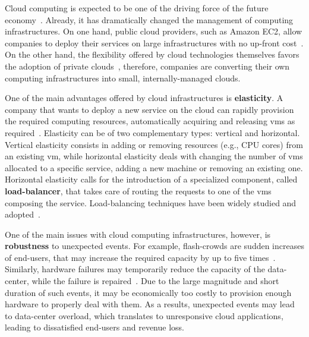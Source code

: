 Cloud computing is expected to be one of the driving force of the
future economy~\citep{WPonMckinsey13}. Already, it has dramatically
changed the management of computing infrastructures. On one hand,
public cloud providers, such as Amazon EC2, allow companies to deploy
their services on large infrastructures with no up-front
cost~\citep{Buyya09:FGCS}. On the other hand, the flexibility offered
by cloud technologies themselves favors the adoption of private
clouds~\citep{Gulati11:HotCloud}, therefore, companies are converting
their own computing infrastructures into small, internally-managed
clouds.

One of the main advantages offered by cloud infrastructures is {\bf
  elasticity}. A company that wants to deploy a new service on the
cloud can rapidly provision the required computing resources,
automatically acquiring and releasing \acp{vm} as
required~\citep{Herbst13:ICAC}.  Elasticity can be of two
complementary types: vertical and horizontal. Vertical elasticity
consists in adding or removing resources (e.g., CPU cores) from an
existing \ac{vm}, while horizontal elasticity deals with changing the
number of \acp{vm} allocated to a specific service, adding a new
machine or removing an existing one.
%
Horizontal elasticity calls for the introduction of a specialized
component, called {\bf load-balancer}, that takes care of routing the
requests to one of the \acp{vm} composing the service. Load-balancing
techniques have been widely studied and
adopted~\citep{Barroso09,Lu11:PerfEval,Lin12:IGCC}.

One of the main issues with cloud computing infrastructures, however,
is {\bf robustness} to unexpected events. For example, flash-crowds
are sudden increases of end-users, that may increase the required
capacity by up to five times~\citep{Bodik10:SoCC}. Similarly, hardware
failures may temporarily reduce the capacity of the data-center, while
the failure is repaired~\citep{Barroso09}. Due to the large magnitude
and short duration of such events, it may be economically too costly
to provision enough hardware to properly deal with them. As a results,
unexpected events may lead to data-center overload, which translates
to unresponsive cloud applications, leading to dissatisfied end-users
and revenue loss.


